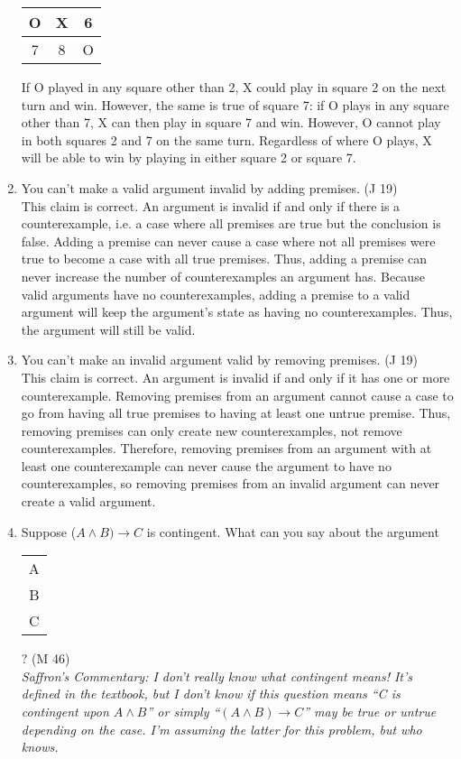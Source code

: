\documentclass{article}
\begin{document}
\begin{enumerate}
\begin{center}
\begin{tabular}{c|c|c}
                        \hline
                        O & X & 6 \\
                        \hline
                        7 & 8 & O
                  \end{tabular}
            \end{center}
            If O played in any square other than 2, X could play in square 2 on the next turn and win. However, the same is true of square 7: if O plays in any square other than 7, X can then play in square 7 and win.
            However, O cannot play in both squares 2 and 7 on the same turn. Regardless of where O plays, X will be able to win by playing in either square 2 or square 7.
      \item You can't make a valid argument invalid by adding premises. (J 19)\\
            This claim is correct. An argument is invalid if and only if there is a counterexample, i.e. a case where all premises are true but the conclusion is false. Adding a premise can never cause a case where not all premises were true to become a case with all true premises. Thus, adding a premise can never increase the number of counterexamples an argument has. Because valid arguments have no counterexamples, adding a premise to a valid argument will keep the argument's state as having no counterexamples. Thus, the argument will still be valid.
      \item You can't make an invalid argument valid by removing premises. (J 19)\\
            This claim is correct. An argument is invalid if and only if it has one or more counterexample. Removing premises from an argument cannot cause a case to go from having all true premises to having at least one untrue premise. Thus, removing premises can only create new counterexamples, not remove counterexamples. Therefore, removing premises from an argument with at least one counterexample can never cause the argument to have no counterexamples, so removing premises from an invalid argument can never create a valid argument.
      \item Suppose ($A \land B) \to C$ is contingent. What can you say about the argument \begin{tabular}{c}A\\B\\\hline C\end{tabular}? (M 46)\\
            \textit{Saffron's Commentary: I don't really know what contingent means! It's defined in the textbook, but I don't know if this question means “C is contingent upon $A \land B$” or simply “$(A \land B) \to C$” may be true or untrue depending on the case. I'm assuming the latter for this problem, but who knows.
}
\end{enumerate}
\end{document}
